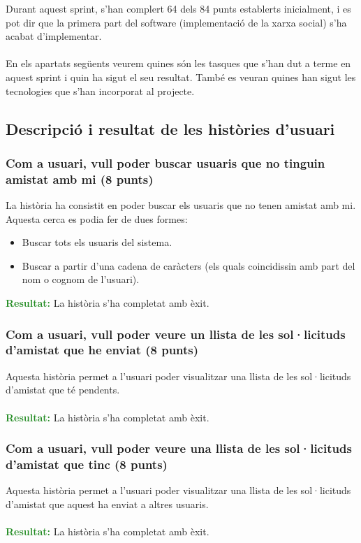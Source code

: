 \documentclass[11pt,catalan,listoffigures,listoftables]{tfgetsinf}
\begin{document}
Durant aquest sprint, s'han complert 64 dels 84 punts establerts inicialment, i es pot dir que la primera part del software (implementació de la xarxa social) s'ha acabat d'implementar.\\ \\
En els apartats següents veurem quines són les tasques que s'han dut a terme en aquest sprint i quin ha sigut el seu resultat. També es veuran quines han sigut les tecnologies que s'han incorporat al projecte.

\subsection{Descripció i resultat de les històries d'usuari}

\subsubsection{Com a usuari, vull poder buscar usuaris que no tinguin amistat amb mi (8 punts)}

La història ha consistit en poder buscar els usuaris que no tenen amistat amb mi. Aquesta cerca es podia fer de dues formes:
\begin{itemize}
\item Buscar tots els usuaris del sistema.
\item Buscar a partir d'una cadena de caràcters (els quals coincidissin amb part del nom o cognom de l'usuari).
\end{itemize}
\textcolor{forestgreen}{\textbf{Resultat:}} La història s'ha completat amb èxit.

\subsubsection{Com a usuari, vull poder veure un llista de les sol·licituds d'amistat que he enviat (8 punts)}
Aquesta història permet a l'usuari poder visualitzar una llista de les sol·licituds d'amistat que té pendents.\\ \\
\textcolor{forestgreen}{\textbf{Resultat:}} La història s'ha completat amb èxit.

\subsubsection{Com a usuari, vull poder veure una llista de les sol·licituds d'amistat que tinc (8 punts)}
Aquesta història permet a l'usuari poder visualitzar una llista de les sol·licituds d'amistat que aquest ha enviat a altres usuaris.\\ \\
\textcolor{forestgreen}{\textbf{Resultat:}} La història s'ha completat amb èxit.
\end{document}
